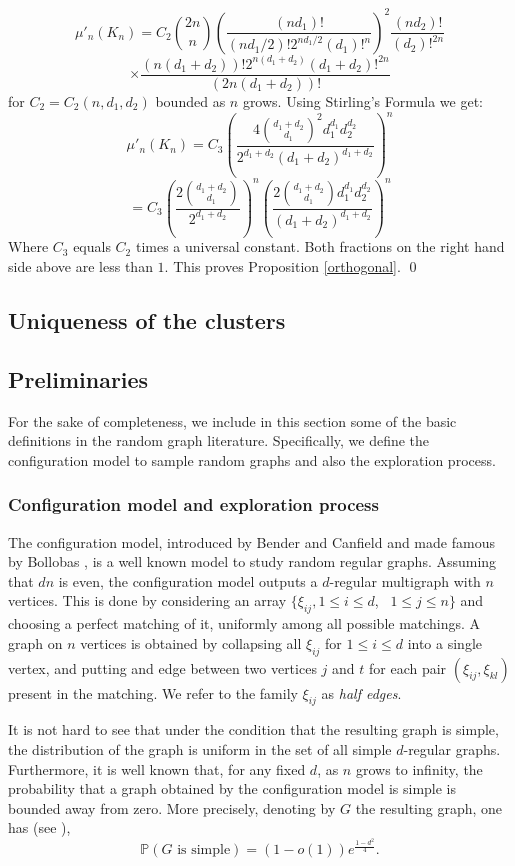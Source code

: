 \documentclass[11pt,reqno]{amsart}
\begin{document}
\[
\mu'_n(K_n)=C_2{{2n}\choose{n}}\left(\frac{(nd_1)!}{(nd_1/2)!2^{nd_1/2}(d_1)!^n}\right)^2\frac{(nd_2)!}{(d_2)!^{2n}}
\]
\[
\times\frac{(n(d_1+d_2))!2^{n(d_1+d_2)}(d_1+d_2)!^{2n}}{(2n(d_1+d_2))!} 
\]
for $C_2=C_2(n,d_1,d_2)$ bounded as $n$ grows. Using Stirling's Formula we get:
\[
\mu'_n(K_n)= C_3\left(\frac{4{{d_1+d_2}\choose{d_1}}^2d_1^{d_1}d_2^{d_2}}{2^{d_1+d_2}(d_1+d_2)^{d_1+d_2}}\right)^n
\]
\[
= C_3\left(\frac{2{{d_1+d_2}\choose{d_1}}}{2^{d_1+d_2}}\right)^n\left(\frac{2{{d_1+d_2}\choose{d_1}}d_1^{d_1}d_2^{d_2}}{(d_1+d_2)^{d_1+d_2}}\right)^n
\]
Where $C_3$ equals $C_2$ times a universal constant. Both fractions on the right hand side above are less than $1$. This proves Proposition \ref{orthogonal}.
\qed

\subsection{Uniqueness of the clusters}\label{proofT1}

\subsection{Preliminaries}\label{pm1}
For the sake of completeness, we include in this section some of the basic definitions in the random graph literature. Specifically, we define the configuration model to sample random graphs and also the exploration process.
\subsubsection{Configuration model and exploration process}\label{ep1}
The configuration model, introduced by Bender and Canfield
\cite{bendercanfield} and made famous by Bollobas \cite{bollobas}, is
a well known model to study random regular graphs. Assuming that $dn$
is even, the configuration model outputs a $d$-regular  multigraph
with $n$ vertices. This is done by considering an array $\{\xi_{ij},
1\leq i\leq d$,~ $1\leq j\leq n\}$ and choosing a perfect matching of
it, uniformly among all possible matchings. A graph on $n$ vertices is
obtained by collapsing all $\xi_{ij}$ for $1\leq i\leq d$ into a
single vertex, and putting and edge between two vertices $j$ and $t$
for each pair $(\xi_{ij},\xi_{kl})$ present in the matching. We refer to the family $\xi_{ij}$ as \emph{half edges}. 

It is not hard to see that under the condition that the resulting graph is simple, the distribution of the graph is uniform in the set of all simple $d$-regular graphs. Furthermore, it is well known that, for any fixed $d$, as $n$ grows to infinity, the probability that a graph obtained by the configuration model is simple is bounded away from zero. More precisely, denoting by $G$ the resulting graph, one has (see \cite{bollobas}),
\[
\mathbb{P}(G\mbox{ is simple})=(1-o(1))e^{\frac{1-d^2}{4}}.
\]
\end{document}

